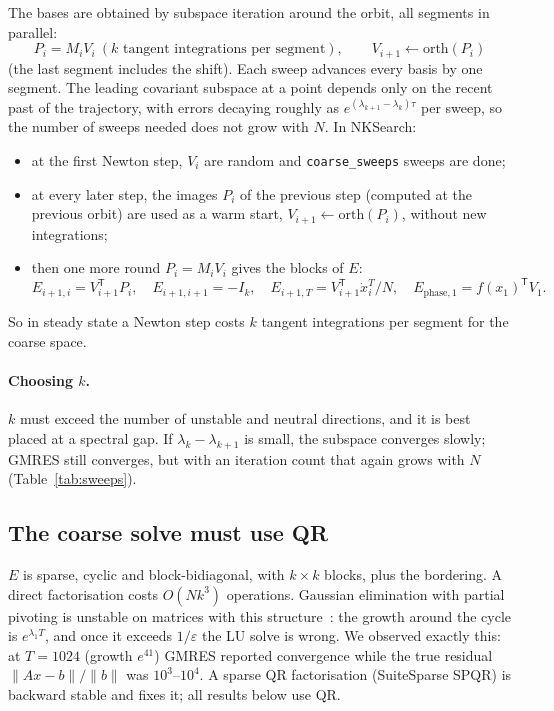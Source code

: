 \documentclass[11pt,a4paper]{article}
\newcommand{\tr}{^{\mathsf T}}
\begin{document}
The bases are obtained by subspace iteration around the orbit, all segments in parallel:
\[
P_i = M_i V_i \ (\text{$k$ tangent integrations per segment}), \qquad V_{i+1} \leftarrow \mathrm{orth}(P_i)
\]
(the last segment includes the shift). Each sweep advances every basis by one segment. The leading covariant subspace at a point depends only on the recent past of the trajectory, with errors decaying roughly as $e^{(\lambda_{k+1} - \lambda_k)\tau}$ per sweep, so the number of sweeps needed does not grow with $N$. In NKSearch:
\begin{itemize}
\item at the first Newton step, $V_i$ are random and \texttt{coarse\_sweeps} sweeps are done;
\item at every later step, the images $P_i$ of the previous step (computed at the previous orbit) are used as a warm start, $V_{i+1} \leftarrow \mathrm{orth}(P_i)$, without new integrations;
\item then one more round $P_i = M_iV_i$ gives the blocks of $E$:
\[
E_{i+1,i} = V_{i+1}\tr P_i, \quad E_{i+1,i+1} = -I_k, \quad E_{i+1,T} = V_{i+1}\tr \dot x^T_i/N, \quad E_{\text{phase},1} = f(x_1)\tr V_1 .
\]
\end{itemize}
So in steady state a Newton step costs $k$ tangent integrations per segment for the coarse space.

\paragraph{Choosing $k$.} $k$ must exceed the number of unstable and neutral directions, and it is best placed at a spectral gap. If $\lambda_k - \lambda_{k+1}$ is small, the subspace converges slowly; GMRES still converges, but with an iteration count that again grows with $N$ (Table~\ref{tab:sweeps}).

\subsection{The coarse solve must use QR}

$E$ is sparse, cyclic and block-bidiagonal, with $k\times k$ blocks, plus the bordering. A direct factorisation costs $O(Nk^3)$ operations. Gaussian elimination with partial pivoting is unstable on matrices with this structure~\cite{wright1993}: the growth around the cycle is $e^{\lambda_1 T}$, and once it exceeds $1/\varepsilon$ the LU solve is wrong. We observed exactly this: at $T = 1024$ (growth $e^{41}$) GMRES reported convergence while the true residual $\|Ax - b\|/\|b\|$ was $10^3$--$10^4$. A sparse QR factorisation (SuiteSparse SPQR) is backward stable and fixes it; all results below use QR.
\end{document}
